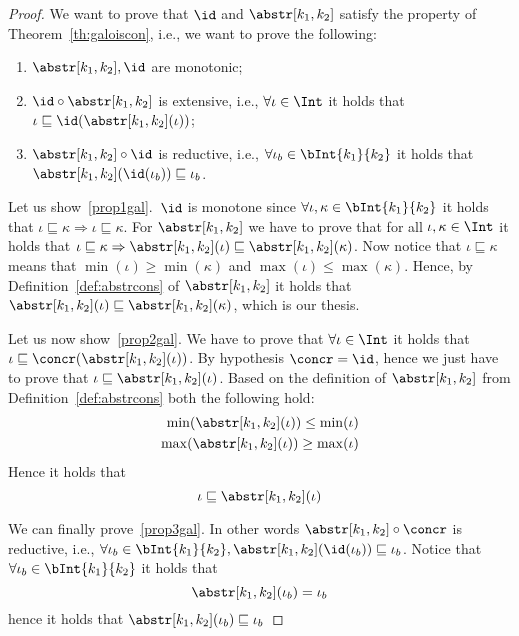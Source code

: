 \begin{proof}
  We want to prove that \(\id\) and \(\abstr[k_1,k_2]\) satisfy the
  property of Theorem~\ref{th:galoiscon}, i.e., we want to prove
  the following:
  \begin{enumerate}[label=(\arabic*)]
  \item\label{prop1gal} \(\abstr[k_1,k_2], \id\) are monotonic;
  \item\label{prop2gal} \(\id \circ \abstr[k_1, k_2]\) is
    extensive, i.e., \(\forall \iota \in \Int\) it holds that
    \(\iota \sqsubseteq \id(\abstr[k_1, k_2](\iota))\);
    
  \item\label{prop3gal} \(\abstr[k_1,k_2] \circ \id\) is reductive,
    i.e., \(\forall \iota_b \in \bInt{k_1}{k_2}\) it holds that
    \(\abstr[k_1, k_2](\id(\iota_b)) \sqsubseteq \iota_b\).
  \end{enumerate}

  \medskip

  \noindent
  Let us show~\ref{prop1gal}.\ \(\id\) is monotone since
  \(\forall \iota, \kappa \in \bInt{k_1}{k_2}\) it holds that
  \(\iota \sqsubseteq \kappa \Rightarrow \iota \sqsubseteq
  \kappa\). For \(\abstr[k_1,k_2]\) we have to prove that for all
  \(\iota, \kappa \in \Int\) it holds that
  \(\iota \sqsubseteq \kappa \Rightarrow \abstr[k_1,k_2](\iota)
  \sqsubseteq \abstr[k_1,k_2](\kappa)\). Now notice that
  \(\iota \sqsubseteq \kappa \) means that
  \(\min(\iota) \geq \min(\kappa)\) and
  \(\max(\iota) \leq \max(\kappa)\). Hence, by
  Definition~\ref{def:abstrcons} of \(\abstr[k_1, k_2]\) it holds that
  \(\abstr[k_1, k_2](\iota) \sqsubseteq \abstr[k_1, k_2](\kappa)\),
  which is our thesis.

  \medskip

  \noindent
  Let us now show~\ref{prop2gal}. We have to prove that
  \(\forall \iota \in \Int\) it holds that
  \(\iota \sqsubseteq \concr(\abstr[k_1,k_2](\iota))\). By hypothesis
  \(\concr = \id\), hence we just have to prove that
  \(\iota \sqsubseteq \abstr[k_1, k_2](\iota)\). Based on the
  definition of \(\abstr[k_1, k_2]\) from
  Definition~\ref{def:abstrcons} both the following hold:
  \begin{align*}
    \min(\abstr[k_1,k_2](\iota)) \leq \min(\iota) \\
    \max(\abstr[k_1,k_2](\iota)) \geq \max(\iota)
  \end{align*}
  Hence it holds that
  \begin{equation}
    \iota \sqsubseteq \abstr[k_1, k_2](\iota)
  \end{equation}

  \medskip

  \noindent
  We can finally prove~\ref{prop3gal}. In other words
  \(\abstr[k_1, k_2] \circ \concr\) is reductive, i.e.,
  \(\forall \iota_b \in \bInt{k_1}{k_2},
  \abstr[k_1,k_2](\id(\iota_b)) \sqsubseteq \iota_b\).  Notice that
  \(\forall \iota_b \in \bInt{k_1}{k_2}\) it holds that
  \begin{equation}\label{eq:injection}
    \abstr[k_1,k_2](\iota_b) = \iota_b
  \end{equation}
  hence it holds that \(\abstr[k_1,k_2](\iota_b) \sqsubseteq \iota_b\)
\end{proof}

